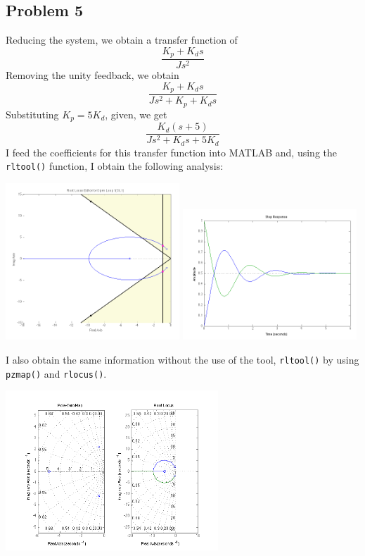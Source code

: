 \documentclass[letterpaper,10pt]{article}
\begin{document}
\subsection*{Problem 5}
Reducing the system, we obtain a transfer function of
$$\dfrac{K_{p}+K_{d}s}{Js^{2}}$$
Removing the unity feedback, we obtain
$$\dfrac{K_{p}+K_{d}s}{Js^{2}+K_{p}+K_{d}s}$$
Substituting $K_{p} = 5K_{d}$, given, we get
$$\dfrac{K_{d}(s+5)}{Js^{2}+K_{d}s+5K_{d}}$$
I feed the coefficients for this transfer function into MATLAB and, using the \texttt{rltool()} function, I obtain the following analysis:
\begin{center}
	\includegraphics[width=0.49\textwidth]{homework04-7-5a.png}
	\includegraphics[width=0.49\textwidth]{homework04-7-5b.png}
\end{center}
I also obtain the same information without the use of the tool, \texttt{rltool()} by using \texttt{pzmap()} and \texttt{rlocus()}.
\begin{center}
	\includegraphics[width=0.6\textwidth]{homework04-7-5c.png}
\end{center}
\end{document}
